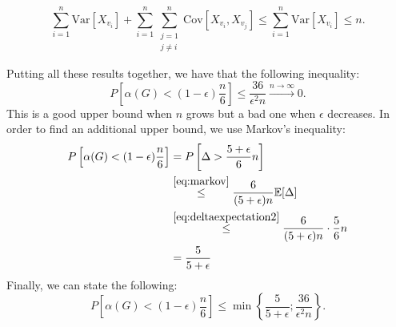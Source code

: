 \documentclass[10pt]{article}
\newenvironment{exercise}[2][Exercise]{\begin{trivlist}
  \item[\hskip \labelsep {\bfseries #1}\hskip \labelsep {\bfseries #2.}]}{\end{trivlist}}
\begin{document}
\begin{exercise}{1c}
\begin{itemize}
$$
 \sum_{i=1}^{n} \mathrm{Var}[X_{v_i}] + \sum_{i = 1}^{n} \sum_{\substack{j=1 \\ j\neq i}}^{n}\mathrm{Cov}[X_{v_i}, X_{v_j}] \leq \sum_{i=1}^{n} \mathrm{Var}[X_{v_i}] \leq n.
$$
\end{itemize}
Putting all these results together, we have that the following inequality:
\begin{equation}
P\left[\alpha(G) < (1-\epsilon)\frac{n}{6}\right] \leq \frac{36}{\epsilon^2 n} \overset{n\to \infty}{\to} 0.
\end{equation}
This is a good upper bound when $n$ grows but a bad one when $\epsilon$ decreases. In order to find an additional upper bound, we use Markov's inequality:
 \begin{align*}
 P\left[\alpha(G) < (1-\epsilon)\frac{n}{6}\right] 	& = P\left[\Delta > \frac{5+\epsilon}{6}n\right]  \\
 									& \overset{\eqref{eq:markov}}{\leq} \frac{6}{(5+\epsilon)n} \mathbb{E}[\Delta] \\
									& \overset{\eqref{eq:deltaexpectation2}}{\leq} \frac{6}{(5+\epsilon)n} \cdot \frac{5}{6}n \\
									& = \frac{5}{5+\epsilon} 
\end{align*}
 Finally, we can state the following:
 $$
  P\left[\alpha(G) < (1-\epsilon)\frac{n}{6}\right] \leq \min\left\{ \frac{5}{5+\epsilon}; \frac{36}{\epsilon^2 n} \right\}.
 $$
 \end{exercise}
  
\end{document}
